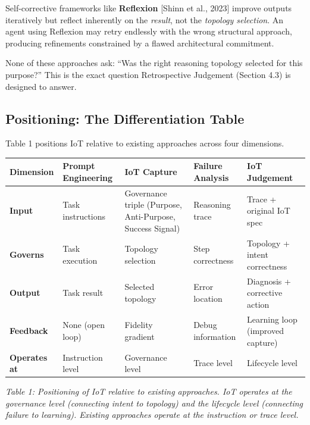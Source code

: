 \documentclass[11pt,a4paper]{article}
\begin{document}
Self-corrective frameworks like \textbf{Reflexion} {[}Shinn et al.,
2023{]} improve outputs iteratively but reflect inherently on the
\emph{result}, not the \emph{topology selection}. An agent using
Reflexion may retry endlessly with the wrong structural approach,
producing refinements constrained by a flawed architectural commitment.

None of these approaches ask: ``Was the right reasoning topology
selected for this purpose?'' This is the exact question Retrospective
Judgement (Section 4.3) is designed to answer.

\subsection{Positioning: The Differentiation
Table}\label{positioning-the-differentiation-table}

Table 1 positions IoT relative to existing approaches across four
dimensions.

{\small\begin{longtable}[]{@{}
  >{\raggedright\arraybackslash}p{}
  >{\raggedright\arraybackslash}p{}
  >{\raggedright\arraybackslash}p{}
  >{\raggedright\arraybackslash}p{}
  >{\raggedright\arraybackslash}p{}@{}}
\toprule\noalign{}
Dimension
 & Prompt Engineering
 & IoT Capture
 & Failure Analysis
 & IoT Judgement
 \\
\midrule\noalign{}
\endhead
\bottomrule\noalign{}
\endlastfoot
\textbf{Input} & Task instructions & Governance triple (Purpose,
Anti-Purpose, Success Signal) & Reasoning trace & Trace + original IoT
spec \\
\textbf{Governs} & Task execution & Topology selection & Step
correctness & Topology + intent correctness \\
\textbf{Output} & Task result & Selected topology & Error location &
Diagnosis + corrective action \\
\textbf{Feedback} & None (open loop) & Fidelity gradient & Debug
information & Learning loop (improved capture) \\
\textbf{Operates at} & Instruction level & Governance level & Trace
level & Lifecycle level \\
\end{longtable}}

\emph{Table 1: Positioning of IoT relative to existing approaches. IoT
operates at the governance level (connecting intent to topology) and the
lifecycle level (connecting failure to learning). Existing approaches
operate at the instruction or trace level.}
\end{document}
